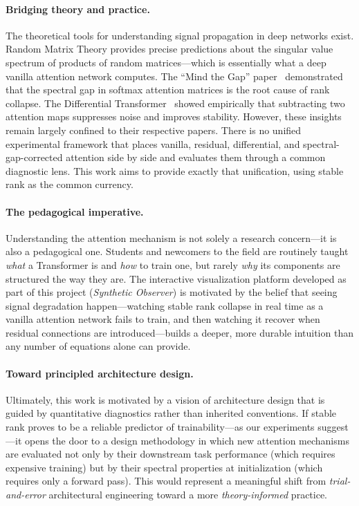 \documentclass[12pt, a4paper]{article}
\begin{document}
\paragraph{Bridging theory and practice.}
The theoretical tools for understanding signal propagation in deep
networks exist. Random Matrix Theory provides precise predictions about
the singular value spectrum of products of random matrices---which is
essentially what a deep vanilla attention network computes. The ``Mind the
Gap'' paper~\cite{mind_the_gap} demonstrated that the spectral gap in
softmax attention matrices is the root cause of rank collapse. The
Differential Transformer~\cite{diff_transformer} showed empirically that
subtracting two attention maps suppresses noise and improves stability.
However, these insights remain largely confined to their respective
papers. There is no unified experimental framework that places vanilla,
residual, differential, and spectral-gap-corrected attention side by
side and evaluates them through a common diagnostic lens. This work aims
to provide exactly that unification, using stable rank as the common
currency.

\paragraph{The pedagogical imperative.}
Understanding the attention mechanism is not solely a research
concern---it is also a pedagogical one. Students and newcomers to the
field are routinely taught \textit{what} a Transformer is and
\textit{how} to train one, but rarely \textit{why} its components are
structured the way they are. The interactive visualization platform
developed as part of this project (\textit{Synthetic Observer}) is
motivated by the belief that seeing signal degradation happen---watching
stable rank collapse in real time as a vanilla attention network fails to
train, and then watching it recover when residual connections are
introduced---builds a deeper, more durable intuition than any number of
equations alone can provide.

\paragraph{Toward principled architecture design.}
Ultimately, this work is motivated by a vision of architecture design
that is guided by quantitative diagnostics rather than inherited
conventions. If stable rank proves to be a reliable predictor of
trainability---as our experiments suggest---it opens the door to a
design methodology in which new attention mechanisms are evaluated not
only by their downstream task performance (which requires expensive
training) but by their spectral properties at initialization (which
requires only a forward pass). This would represent a meaningful shift
from \textit{trial-and-error} architectural engineering toward a more
\textit{theory-informed} practice.
\end{document}
